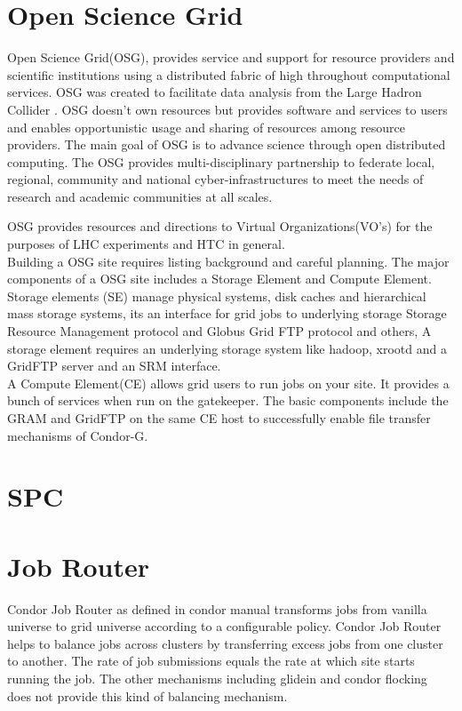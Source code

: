 \documentclass[ms,electronic,double]{nuthesis}
\begin{document}
 
\section{Open Science Grid} Open Science Grid(OSG), provides service and support 
for resource providers and scientific institutions using a distributed fabric of 
high throughout computational services. OSG was created to facilitate data analysis from the 
Large Hadron Collider . OSG doesn't own resources but provides software and services to 
users and enables opportunistic usage and sharing of resources among resource providers.
The main goal of OSG is to advance science through open distributed computing. 
The OSG provides multi-disciplinary partnership to federate local, regional, community and 
national cyber-infrastructures to meet the needs of research and academic communities at all scales.

OSG provides resources and directions to Virtual Organizations(VO's) for the purposes of LHC experiments
and HTC in general. \\

Building a OSG site requires listing background and careful planning. The major 
components of a OSG site includes a Storage Element and Compute Element. \\

Storage elements (SE) manage physical systems, disk caches and hierarchical mass storage 
systems, its an interface for grid jobs to underlying storage Storage Resource Management protocol and Globus 
Grid FTP protocol and others, A storage element requires an underlying storage system like hadoop, xrootd
and a GridFTP server and an SRM interface.\\

A Compute Element(CE) allows grid users to run jobs on your site. It provides a 
bunch of services when run on the gatekeeper. The basic components include 
the GRAM and GridFTP on the same CE host to successfully enable file transfer 
mechanisms of Condor-G.\\

\section{SPC}

\section{Job Router}
Condor Job Router as defined in condor manual\cite{manual56} transforms jobs from vanilla 
universe to grid universe according to a configurable policy.   Condor Job 
Router helps to balance jobs across clusters by transferring excess jobs from 
one cluster to another.  The rate of job submissions equals the rate at which 
site starts running the job. The other mechanisms including glidein and condor 
flocking does not provide this kind of balancing mechanism.
\end{document}
